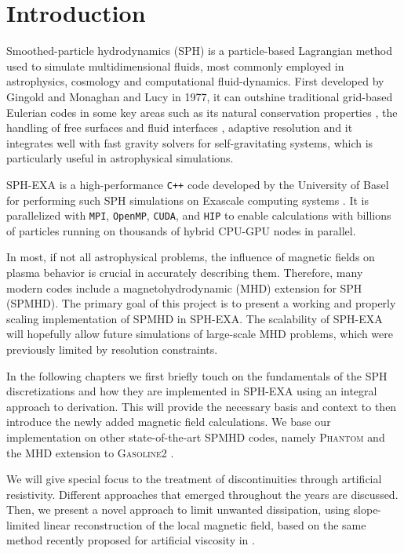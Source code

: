 \section{Introduction}

Smoothed-particle hydrodynamics (SPH) is a particle-based Lagrangian method used to simulate multidimensional fluids, most commonly employed in astrophysics, cosmology and computational fluid-dynamics. First developed by Gingold and Monaghan\cite{GingoldMonaghan1977} and Lucy\cite{Lucy1977} in 1977, it can outshine traditional grid-based Eulerian codes in some key areas such as its natural conservation properties \cite{Rosswog2009}, the handling of free surfaces and fluid interfaces \cite{He2024}, adaptive resolution \cite{Price2010} and it integrates well with fast gravity solvers for self-gravitating systems, which is particularly useful in astrophysical simulations. 

SPH-EXA is a high-performance \texttt{C++} code developed by the University of Basel for performing such SPH simulations on Exascale computing systems \cite{Cavelan2020}. It is parallelized with \texttt{MPI}, \texttt{OpenMP}, \texttt{CUDA}, and \texttt{HIP} to enable calculations with billions of particles running on thousands of hybrid CPU-GPU nodes in parallel. 

In most, if not all astrophysical problems, the influence of magnetic fields on plasma behavior is crucial in accurately describing them. Therefore, many modern codes include a magnetohydrodynamic (MHD) extension for SPH (SPMHD). The primary goal of this project is to present a working and properly scaling implementation of SPMHD in SPH-EXA. The scalability of SPH-EXA will hopefully allow future simulations of large-scale MHD problems, which were previously limited by resolution constraints. 

In the following chapters we first briefly touch on the fundamentals of the SPH discretizations and how they are implemented in SPH-EXA using an integral approach to derivation. This will provide the necessary basis and context to then introduce the newly added magnetic field calculations. We base our implementation on other state-of-the-art SPMHD codes, namely \textsc{Phantom} \cite{Price2018} and the MHD extension to \textsc{Gasoline2} \cite{Wadsley2017, WissingShen2020}. 

We will give special focus to the treatment of discontinuities through artificial resistivity. Different approaches that emerged throughout the years are discussed. Then, we present a novel approach to limit unwanted dissipation, using slope-limited linear reconstruction of the local magnetic field, based on the same method recently proposed for artificial viscosity in \cite{GarciaSenzCabezon2026}. 

